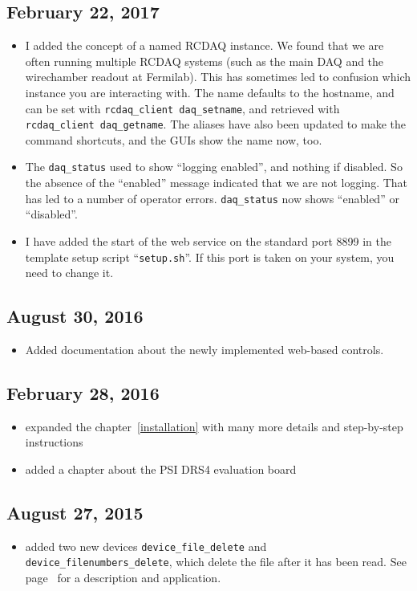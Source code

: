 \documentclass{article}[11pt]
\begin{document}
\subsection{February 22, 2017}
\begin{itemize}
\item I added the concept of a named RCDAQ instance. We found that we
  are often running multiple RCDAQ systems (such as the main DAQ and
  the wirechamber readout at Fermilab). This has sometimes led to
  confusion which instance you are interacting with. The name
  defaults to the hostname, and can be set with
  \verb|rcdaq_client daq_setname|, and retrieved with
  \verb|rcdaq_client daq_getname|.  The aliases have also been
  updated to make the command shortcuts, and the GUIs show the name
  now, too. 
\item The \verb|daq_status| used to show ``logging enabled'', and nothing if
  disabled. So the absence of the ``enabled'' message indicated
  that we are not logging. That has led to a number of operator
  errors. \verb|daq_status| now shows ``enabled'' or ``disabled''. 
\item I have added the start of the web service on the standard port
  8899 in the template setup script ``\verb|setup.sh|''. If this port
  is taken on your system, you need to change it. 

\end{itemize}

\subsection{August 30, 2016}
\begin{itemize}
\item Added documentation about the newly implemented web-based controls. 
\end{itemize}

\subsection{February 28, 2016}
\begin{itemize}
\item expanded the chapter~\ref{installation} with many more details
  and step-by-step instructions
\item  added a chapter about the PSI DRS4 evaluation board 
\end{itemize}

\subsection{August 27, 2015}
\begin{itemize}
\item  added two new devices \verb|device_file_delete| and
  \verb|device_filenumbers_delete|, which
  delete the file after it has been read. See page~\pageref{delete} for a description and application.
\end{itemize}
\end{document}
